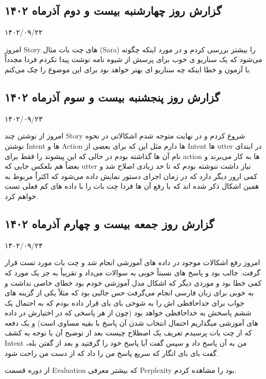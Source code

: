\subsection{گزارش روز چهارشنبه بیست و دوم آذر‌ماه ۱۴۰۲}

۱۴۰۲/۰۹/۲۲

امروز Story های چت بات مثال (Sara) را بیشتر بررسی کردم و در مورد اینکه چگونه می‌شود که یک سناریو ی خوب برای پرسش از شیوه نامه نوشت پیدا نکردم فردا مجدداً با آزمون و خطا اینکه چه سناریو ای بهتر خواهد بود برای این موضوع را چک می‌کنم.


\subsection{گزارش روز پنجشنبه بیست و سوم آذر‌ماه ۱۴۰۲}

۱۴۰۲/۰۹/۲۳

امروز از نوشتن چند Story شروع کردم و در نهایت متوجه شدم اشکالاتی در نحوه نوشتن Intent ها و Action ها دارم مثل این که برای بعضی از Intent ها utter در ابتدای نام آن ها گذاشته بودم در حالی که این پیشوند را فقط برای action ها به کار می‌برند و بعضاً هم بلعکس جایی که utter نیاز داشت ننوشته بودم که تا حد زیادی اصلاح شد و کمی ارور دیگر دارد که در زمان اجرای دستور  نمایش داده می‌شود که اکثراً مربوط به همین اشکال ذکر شده اند که با رفع آن ها فردا چت بات را با داده های کم فعلی تست خواهم کرد.


\subsection{گزارش روز جمعه بیست و چهارم آذر‌ماه ۱۴۰۲}

۱۴۰۲/۰۹/۲۴

امروز رفع اشکالات موجود در داده های آموزشی انجام شد و چت بات مورد تست قرار گرفت. جالب بود و پاسخ های نسبتاً خوبی به سوالات می‌داد و تقریباً به جز یک مورد که کمی خطا بود و موردی دیگر که اشکال مدل آموزشی خودم بود خطای خاصی نداشت و به خوبی  برای زبان فارسی انجام می‌گرفت حس جالبی بود که مثلاً یکی از گزینه های جواب برای خداحافظی اش را به شوخی بای بای قرار داده بودم که به احتمال یک ششم پاسخش به خداحافظی خواهد بود (چون از هر پاسخی که در اختیارش در داده های آموزشی میگذاریم احتمال انتخاب شدن آن پاسخ با بقیه مساوی است) و یک دفعه که از چت بات پرسیدم تعریف یک اصطلاح چیست بعد از توضیح آن با توجه به کشف Intent من به آن پاسخ داد و سپس گفت آیا پاسخ خود را گرفتید و بعد از گفتن بله، گفت بای بای انگار که سریع پاسخ من را داد که از دست من راحت شود.

از دوره  قسمت Evaluation که بیشتر معرفی Perplexity بود را مشاهده کردم.

